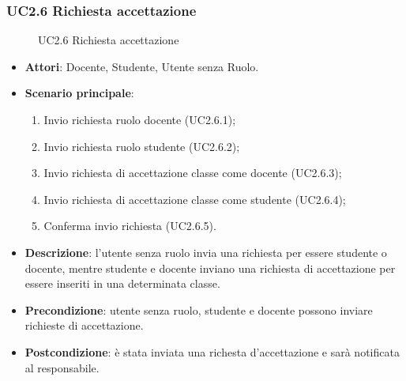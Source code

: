 \subsubsection{UC2.6 Richiesta accettazione}
\begin{figure}[H]
\centering
\noindent{}
\caption{UC2.6 Richiesta accettazione}
\end{figure}
\begin{itemize}
\item \textbf{Attori}: Docente, Studente, Utente senza Ruolo.
\item \textbf{Scenario principale}:
\begin{enumerate}
\item Invio richiesta ruolo docente (UC2.6.1);
\item Invio richiesta ruolo studente (UC2.6.2);
\item Invio richiesta di accettazione classe come docente (UC2.6.3);
\item Invio richiesta di accettazione classe come studente (UC2.6.4);
\item Conferma invio richiesta (UC2.6.5).
\end{enumerate}
\item \textbf{Descrizione}: l’utente senza ruolo invia una richiesta per essere studente o docente, mentre studente e docente inviano una richiesta di accettazione per essere inseriti in una determinata classe.
\item \textbf{Precondizione}: utente senza ruolo, studente e docente possono inviare richieste di accettazione.
\item \textbf{Postcondizione}: è stata inviata una richesta d’accettazione e sarà notificata al responsabile.
\end{itemize}
